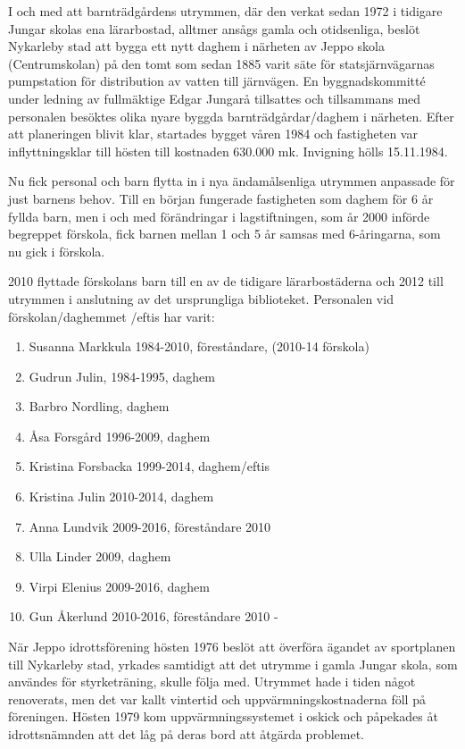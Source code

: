 

I och med att barnträdgårdens utrymmen, där den verkat sedan 1972 i tidigare Jungar skolas ena lärarbostad, alltmer ansågs gamla och otidsenliga, beslöt Nykarleby stad att bygga ett nytt daghem i närheten av Jeppo skola (Centrumskolan) på den tomt som sedan 1885 varit säte för statsjärnvägarnas pumpstation för distribution av vatten till järnvägen. En byggnadskommitté under ledning av fullmäktige Edgar Jungarå tillsattes och tillsammans med personalen besöktes olika nyare byggda barnträdgårdar/daghem i närheten. Efter att planeringen  blivit klar, startades bygget våren 1984 och fastigheten var inflyttningsklar till hösten till kostnaden 630.000 mk. Invigning hölls 15.11.1984.

Nu fick personal och barn flytta in i nya ändamålsenliga utrymmen anpassade för just barnens behov. Till en början fungerade fastigheten  som daghem för 6 år fyllda barn, men i och med förändringar i lagstiftningen, som år 2000 införde begreppet förskola, fick barnen mellan 1 och 5 år samsas med 6-åringarna, som nu gick i förskola.

2010 flyttade förskolans barn till en av de tidigare lärarbostäderna och 2012 till utrymmen i anslutning av det ursprungliga biblioteket. Personalen vid förskolan/daghemmet /eftis har varit:
\begin{enumerate}
  \item Susanna Markkula 1984-2010, föreståndare, (2010-14 förskola)
  \item Gudrun Julin, 1984-1995, daghem
  \item Barbro Nordling, daghem
  \item Åsa Forsgård 1996-2009, daghem
  \item Kristina Forsbacka 1999-2014, daghem/eftis
  \item Kristina Julin 2010-2014, daghem
  \item Anna Lundvik 2009-2016, föreståndare 2010
  \item Ulla Linder 2009, daghem
  \item Virpi Elenius 2009-2016, daghem
  \item Gun Åkerlund 2010-2016, föreståndare 2010 -
\end{enumerate}




När Jeppo idrottsförening hösten 1976 beslöt att överföra ägandet av sportplanen till Nykarleby stad, yrkades samtidigt att det utrymme i gamla Jungar skola, som användes för styrketräning, skulle följa med. Utrymmet hade i tiden något renoverats, men det var kallt vintertid och uppvärmningskostnaderna föll på föreningen. Hösten 1979 kom uppvärmningssystemet i oskick och påpekades åt idrottsnämnden att det låg på deras bord att åtgärda problemet.

